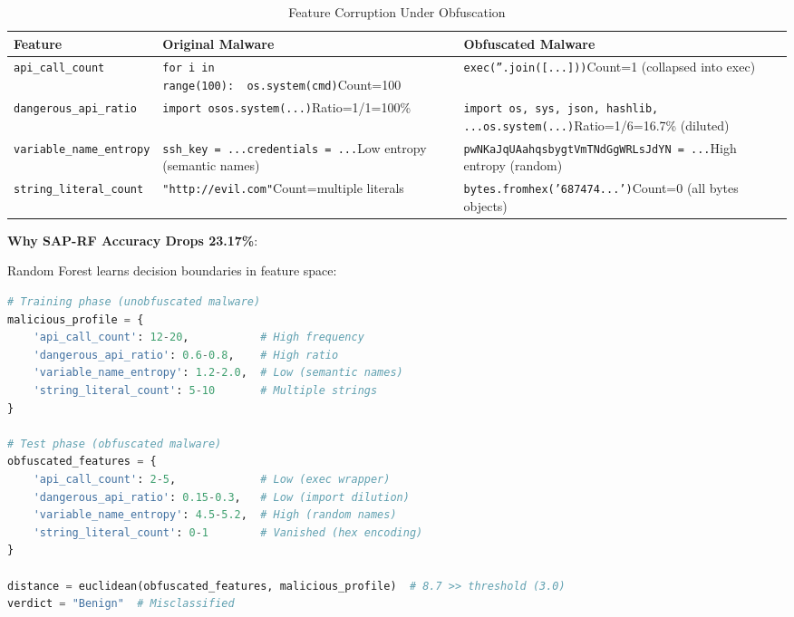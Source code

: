 \begin{table}[h]
\centering
\caption{Feature Corruption Under Obfuscation}
\label{tab:feature-corruption}
\small
\begin{tabular}{p{3.5cm}p{5cm}p{5.5cm}}
\toprule
\textbf{Feature} & \textbf{Original Malware} & \textbf{Obfuscated Malware} \\
\midrule
\texttt{api\_call\_count} & \texttt{for i in range(100):}\newline\texttt{~~os.system(cmd)}\newline Count=100 & \texttt{exec(''.join([...]))}\newline Count=1 (collapsed into exec) \\
\midrule
\texttt{dangerous\_api\_ratio} & \texttt{import os}\newline\texttt{os.system(...)}\newline Ratio=1/1=100\% & \texttt{import os, sys, json, hashlib, ...}\newline\texttt{os.system(...)}\newline Ratio=1/6=16.7\% (diluted) \\
\midrule
\texttt{variable\_name\_entropy} & \texttt{ssh\_key = ...}\newline\texttt{credentials = ...}\newline Low entropy (semantic names) & \texttt{pwNKaJqUAahqsbygtVmTNdGgWRLsJdYN = ...}\newline High entropy (random) \\
\midrule
\texttt{string\_literal\_count} & \texttt{"http://evil.com"}\newline Count=multiple literals & \texttt{bytes.fromhex('687474...')}\newline Count=0 (all bytes objects) \\
\bottomrule
\end{tabular}
\end{table}

\textbf{Why SAP-RF Accuracy Drops 23.17\%}:

Random Forest learns decision boundaries in feature space:
\begin{lstlisting}[language=Python]
# Training phase (unobfuscated malware)
malicious_profile = {
    'api_call_count': 12-20,           # High frequency
    'dangerous_api_ratio': 0.6-0.8,    # High ratio
    'variable_name_entropy': 1.2-2.0,  # Low (semantic names)
    'string_literal_count': 5-10       # Multiple strings
}

# Test phase (obfuscated malware)
obfuscated_features = {
    'api_call_count': 2-5,             # Low (exec wrapper)
    'dangerous_api_ratio': 0.15-0.3,   # Low (import dilution)
    'variable_name_entropy': 4.5-5.2,  # High (random names)
    'string_literal_count': 0-1        # Vanished (hex encoding)
}

distance = euclidean(obfuscated_features, malicious_profile)  # 8.7 >> threshold (3.0)
verdict = "Benign"  # Misclassified
\end{lstlisting}

